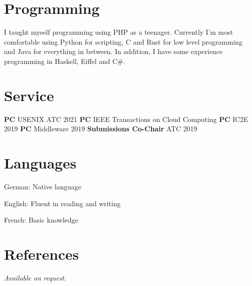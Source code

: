 \documentclass[margin,line]{cv/cv}
\begin{document}
\begin{resume}
    \section{\mysidestyle Programming}

    I taught myself programming using PHP as a teenager. Currently I'm most
    comfortable using Python for scripting, C and Rust for low level programming and
    Java for everything in between. In addition, I have some experience programming
    in Haskell, Eiffel and C\#.

    \section{\mysidestyle Service}
    \textbf{PC} USENIX ATC 2021 %
    \textbf{PC} IEEE Transactions on Cloud Computing %
    \textbf{PC} IC2E 2019 %
    \textbf{PC} Middleware 2019 %
    \textbf{Submissions Co-Chair} ATC 2019 %


    \section{\mysidestyle Languages}
    \begin{list2}
        \item German: Native language
        \item English: Fluent in reading and writing
        \item French: Basic knowledge
    \end{list2}\vspace{-1.5mm}

    \pagebreak

    \section{\mysidestyle References}
     {\sl Available on request.}


\end{resume}
\end{document}
